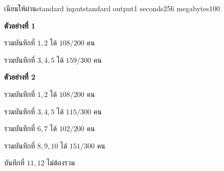 \documentclass[11pt,a4paper]{article}
\begin{document}
\begin{problem}{เนียนให้ผ่าน}{standard input}{standard output}{1 seconds}{256 megabytes}{100}
\Note
\begin{note}
\textbf{ตัวอย่างที่ 1}

รวมบันทึกที่ $1,2$ ได้ $108/200$ คน

รวมบันทึกที่ $3,4,5$ ได้ $159/300$ คน

\textbf{ตัวอย่างที่ 2}

รวมบันทึกที่ $1,2$ ได้ $108/200$ คน

รวมบันทึกที่ $3,4,5$ ได้ $115/300$ คน

รวมบันทึกที่ $6,7$ ได้ $102/200$ คน

รวมบันทึกที่ $8,9,10$ ได้ $151/300$ คน

บันทึกที่ $11,12$ ไม่ต้องรวม

\end{note}


\end{problem}
\end{document}
